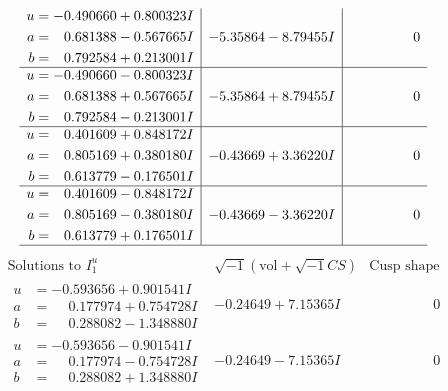 \documentclass[1p]{elsarticle_modified}
\theoremstyle{definition}
\newcommand{\I}{\sqrt{-1}}
\begin{document}
$$\begin{array}{c|c|c}
\begin{aligned}
u &= -0.490660 + 0.800323 I \\
a &= \phantom{-}0.681388 - 0.567665 I \\
b &= \phantom{-}0.792584 + 0.213001 I\end{aligned}
 & -5.35864 - 8.79455 I & \phantom{-0.000000 } 0 \\ \hline\begin{aligned}
u &= -0.490660 - 0.800323 I \\
a &= \phantom{-}0.681388 + 0.567665 I \\
b &= \phantom{-}0.792584 - 0.213001 I\end{aligned}
 & -5.35864 + 8.79455 I & \phantom{-0.000000 } 0 \\ \hline\begin{aligned}
u &= \phantom{-}0.401609 + 0.848172 I \\
a &= \phantom{-}0.805169 + 0.380180 I \\
b &= \phantom{-}0.613779 - 0.176501 I\end{aligned}
 & -0.43669 + 3.36220 I & \phantom{-0.000000 } 0 \\ \hline\begin{aligned}
u &= \phantom{-}0.401609 - 0.848172 I \\
a &= \phantom{-}0.805169 - 0.380180 I \\
b &= \phantom{-}0.613779 + 0.176501 I\end{aligned}
 & -0.43669 - 3.36220 I & \phantom{-0.000000 } 0\\
 \hline 
 \end{array}$$\newpage$$\begin{array}{c|c|c}  
\text{Solutions to }I^u_{1}& \I (\text{vol} + \sqrt{-1}CS) & \text{Cusp shape}\\
 \hline 
\begin{aligned}
u &= -0.593656 + 0.901541 I \\
a &= \phantom{-}0.177974 + 0.754728 I \\
b &= \phantom{-}0.288082 - 1.348880 I\end{aligned}
 & -0.24649 + 7.15365 I & \phantom{-0.000000 } 0 \\ \hline\begin{aligned}
u &= -0.593656 - 0.901541 I \\
a &= \phantom{-}0.177974 - 0.754728 I \\
b &= \phantom{-}0.288082 + 1.348880 I\end{aligned}
 & -0.24649 - 7.15365 I & \phantom{-0.000000 } 0 \\ \hline\begin{aligned}

\end{aligned}
\end{array}$$
\end{document}
